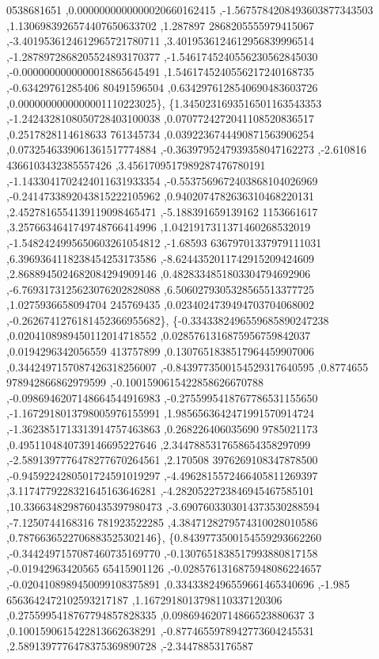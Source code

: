 \begin{DoxyCode}
      0538681651 ,0.0000000000000020660162415 ,-1.5675784208493603877343503 ,1.1306983926574407650633702 ,1.287897
      2868205555979415067 ,-3.4019536124612965721780711 ,3.4019536124612956839996514 ,-1.2878972868205524893170377
       ,-1.5461745240556230562845030 ,-0.0000000000000018865645491 ,1.5461745240556217240168735 ,-0.63429761285406
      80491596504 ,0.6342976128540690483603726 ,0.0000000000000001110223025\},
\{1.3450231693516501163543353 ,-1.2424328108050728403100038 ,0.0707724272041108520836517 ,0.2517828114618633
      761345734 ,0.0392236744490871563906254 ,0.0732546339061361517774884 ,-0.3639795247939358047162273 ,-2.610816
      4366103432385557426 ,3.4561709517989287476780191 ,-1.1433041702424011631933354 ,-0.5537569672403868104026969
       ,-0.2414733892043815222105962 ,0.9402074782636310468220131 ,2.4527816554139119098465471 ,-5.188391659139162
      1153661617 ,3.2576634641749748766414996 ,1.0421917311371460268532019 ,-1.5482424995650603261054812 ,-1.68593
      63679701337979111031 ,6.3969364118238454253173586 ,-8.6244352011742915209424609 ,2.8688945024682084294909146
       ,0.4828334851803304794692906 ,-6.7693173125623076202828088 ,6.5060279305328565513377725 ,1.0275936658094704
      245769435 ,0.0234024739494703704068002 ,-0.2626741276181452366955682\},
\{-0.3343382496559685890247238 ,0.0204108989450112014718552 ,0.0285761316875956759842037 ,0.0194296342056559
      413757899 ,0.1307651838517964459907006 ,0.3442497157087426318256007 ,-0.8439773500154529317640595 ,0.8774655
      978942866862979599 ,-0.1001590615422858626670788 ,-0.0986946207148664544916983 ,-0.2755995418767786531155650
       ,-1.1672918013798005976155991 ,1.9856563642471991570914724 ,-1.3623851713313914757463863 ,0.268226406035690
      9785021173 ,0.4951104840739146695227646 ,2.3447885317658654358297099 ,-2.5891397776478277670264561 ,2.170508
      3976269108347878500 ,-0.9459224280501724591019297 ,-4.4962815572466405811269397 ,3.1174779228321645163646281
       ,-4.2820522723846945467585101 ,10.3366348298760435397980473 ,-3.6907603303014373530288594 ,-7.1250744168316
      781923522285 ,4.3847128279574310028010586 ,0.7876636522706883525302146\},
\{0.8439773500154559293662260 ,-0.3442497157087460735169770 ,-0.1307651838517993880817158 ,-0.01942963420565
      65415901126 ,-0.0285761316875948086224657 ,-0.0204108989450099108375891 ,0.3343382496559661465340696 ,-1.985
      6563642472102593217187 ,1.1672918013798110337120306 ,0.2755995418767794857828335 ,0.098694620714866523880637
      3 ,0.1001590615422813662638291 ,-0.8774655978942773604245531 ,2.5891397776478375369890728 ,-2.34478853176587

\end{DoxyCode}
